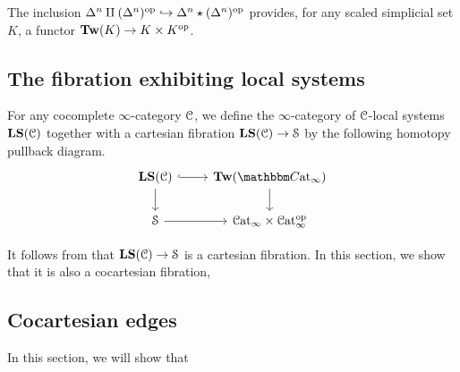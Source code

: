 \documentclass[main.tex]{subfiles}
\begin{document}
The inclusion $\Delta^{n} \amalg (\Delta^{n})^{\mathrm{op}} \hookrightarrow \Delta^{n} \star (\Delta^{n})^{\mathrm{op}}$ provides, for any scaled simplicial set $K$, a functor $\mathbf{Tw}(K) \to K \times K^{\mathrm{op}}$.

\subsection{The fibration exhibiting local systems}
\label{ssc:the_fibration}

\begin{definition}
  For any cocomplete $\infty$-category $\mathcal{C}$, we define the $\infty$-category of $\mathcal{C}$-local systems $\mathbf{LS}(\mathcal{C})$ together with a cartesian fibration $\mathbf{LS}(\mathcal{C}) \to \mathcal{S}$ by the following homotopy pullback diagram.
  \begin{equation*}
    \begin{tikzcd}
      \LS(\category{C})
      \arrow[r, hook]
      \arrow[d]
      & \Tw(\ICCat)
      \arrow[d]
      \\
      \S
      \arrow[r]
      & \ICat \times \ICat\op
    \end{tikzcd}
  \end{equation*}
\end{definition}

It follows from \cite{garcia2020enhanced} that $\mathbf{LS}(\mathcal{C}) \to \mathcal{S}$ is a cartesian fibration. In this section, we show that it is also a cocartesian fibration,

\subsection{Cocartesian edges}
\label{ssc:cocartesian_edges}

In this section, we will show that 
\end{document}
